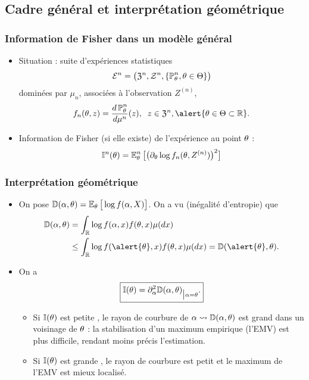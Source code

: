 \subsection{Cadre général et interprétation géométrique}

\begin{frame}
\frametitle{Information de Fisher dans un modèle général}
\begin{df}
\begin{itemize}
\item \alert{Situation} : suite d'expériences statistiques
$${\mathcal E}^n=\big(\mathfrak{Z}^n, {\mathcal Z}^n, \{\operatorname{{\mathbb P}}_\theta^n,\theta \in \Theta\}\big)$$
dominées par $\mu_n$, associées à l'observation $Z^{(n)}$,
$$f_n(\truetheta,z)=\frac{d\PP_\truetheta^n}{d\mu^n}(z),\;\;z\in\mathfrak{Z}^n,\alert{\truetheta \in \Theta \subset \R}.$$
\item \alert{ Information de Fisher} (si elle existe) de l'expérience au point $\theta$ :
$$\mathbb{I}^n(\theta)=\operatorname{{\mathbb E}}_\theta^n\big[\big(\partial_\theta \log  f_n(\theta, Z^{(n)})\big)^2\big]$$
\end{itemize}
\end{df}
\end{frame}



\begin{frame}
\frametitle{Interprétation géométrique}
\begin{itemize}
\item On pose $\mathbb{D}(\alpha,\theta)=\operatorname{{\mathbb E}}_\theta\big[\log f(\alpha,X)\big]$. On a vu (inégalité d'entropie) que
\begin{align*}
\mathbb{D}(\curtheta,\truetheta) & = \int_{\R}\log f(\curtheta,x) f(\truetheta,x)\mu(dx) \\
&  \leq \int_{\R}\log f(\alert{\truetheta}, x) f(\truetheta,x)\mu(dx) = \mathbb{D}(\alert{\truetheta},\truetheta).
\end{align*}
\item On a
$$\boxed{\mathbb{I}(\theta)=\partial_\alpha^2 \mathbb{D}(\alpha,\theta)_{\big|\alpha=\theta}.
}$$
\begin{itemize}
\item Si $\mathbb{I}(\theta)$ est \og petite \fg{}, le \alert{rayon de courbure de $\alpha \leadsto \mathbb{D}(\alpha,\theta)$ est grand} dans un voisinage de $\theta$ : la stabilisation d'un maximum empirique (l'EMV) est plus difficile, rendant moins précis l'estimation.
\item Si $\mathbb{I}(\theta)$ est \og grande \fg{}, le \alert{ rayon de courbure est petit} et le maximum de l'EMV est mieux localisé.
 \end{itemize}
\end{itemize}
\end{frame}




